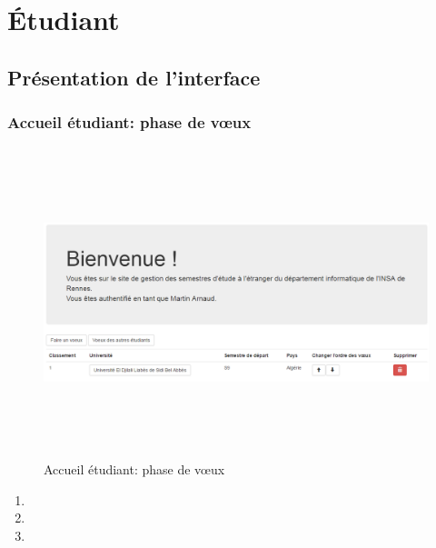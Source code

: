\chapter{Étudiant}

\section{Présentation de l'interface}

  \subsection{Accueil étudiant: phase de vœux}
   	\label{pv}
   	\begin{figure}[H]
  	\centering
  	
  	\includegraphics[width=16cm,height=9cm]{Images/Etudiant/faire_voeux_etud.png}
  	\caption{Accueil étudiant: phase de vœux}
  \end{figure}
            
    \begin{enumerate}
           	\item
           	\item
           	\item
     \end{enumerate}



